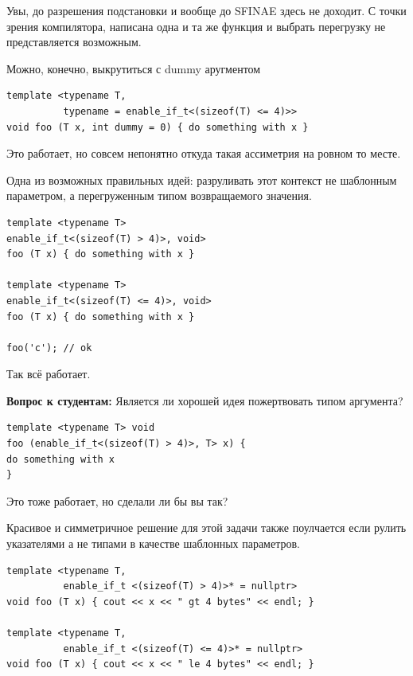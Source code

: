 \documentclass[a4paper,12pt,oneside]{article}
\newif\ifanswers
\begin{document}
Увы, до разрешения подстановки и вообще до SFINAE здесь не доходит. С точки зрения компилятора, написана одна и та же функция и выбрать перегрузку не представляется возможным.

Можно, конечно, выкрутиться с dummy аругментом

\begin{lstlisting}
template <typename T, 
          typename = enable_if_t<(sizeof(T) <= 4)>>
void foo (T x, int dummy = 0) { do something with x }
\end{lstlisting}

Это работает, но совсем непонятно откуда такая ассиметрия на ровном то месте.

Одна из возможных правильных идей: разруливать этот контекст не шаблонным параметром, а перегруженным типом возвращаемого значения.

\begin{lstlisting}
template <typename T>
enable_if_t<(sizeof(T) > 4)>, void> 
foo (T x) { do something with x }

template <typename T>
enable_if_t<(sizeof(T) <= 4)>, void> 
foo (T x) { do something with x }

foo('c'); // ok
\end{lstlisting}

Так всё работает.

\textbf{Вопрос к студентам:} Является ли хорошей идея пожертвовать типом аргумента?

\begin{lstlisting}
template <typename T> void 
foo (enable_if_t<(sizeof(T) > 4)>, T> x) { 
do something with x 
}
\end{lstlisting}

Это тоже работает, но сделали ли бы вы так?

\ifanswers
Правильный ответ: с моей точки зрения это крайне плохая идея, так как она убивает вывод типов.
\fi

Красивое и симметричное решение для этой задачи также поулчается если рулить указателями а не типами в качестве шаблонных параметров.

\begin{lstlisting}
template <typename T,
          enable_if_t <(sizeof(T) > 4)>* = nullptr>
void foo (T x) { cout << x << " gt 4 bytes" << endl; }

template <typename T,
          enable_if_t <(sizeof(T) <= 4)>* = nullptr>
void foo (T x) { cout << x << " le 4 bytes" << endl; }
\end{lstlisting}
\end{document}
